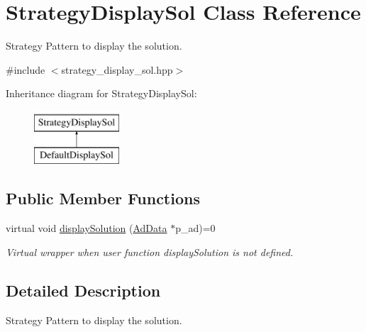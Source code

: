 \hypertarget{classStrategyDisplaySol}{\section{\-Strategy\-Display\-Sol \-Class \-Reference}
\label{classStrategyDisplaySol}
}


\-Strategy \-Pattern to display the solution.  




{\ttfamily \#include $<$strategy\-\_\-display\-\_\-sol.\-hpp$>$}

\-Inheritance diagram for \-Strategy\-Display\-Sol\-:\begin{figure}[H]
\begin{center}
\leavevmode
\includegraphics[height=2.000000cm]{classStrategyDisplaySol}
\end{center}
\end{figure}
\subsection*{\-Public \-Member \-Functions}
\begin{DoxyCompactItemize}
\item 
virtual void \hyperlink{classStrategyDisplaySol_aa4d70248e3281b868beb92875c8503c5}{display\-Solution} (\hyperlink{classAdData}{\-Ad\-Data} $\ast$p\-\_\-ad)=0
\begin{DoxyCompactList}\small\item\em \-Virtual wrapper when user function display\-Solution is not defined. \end{DoxyCompactList}\end{DoxyCompactItemize}


\subsection{\-Detailed \-Description}
\-Strategy \-Pattern to display the solution. 

